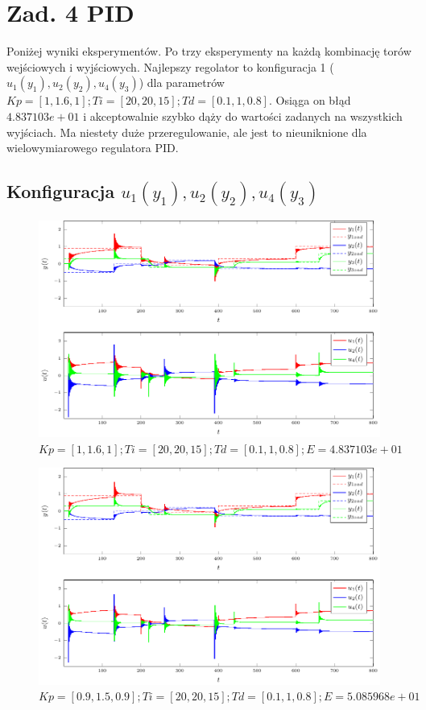 \documentclass[a4paper,titlepage,11pt,twosides,floatssmall]{mwrep}
\begin{document}
\chapter*{Zad. 4 PID}

Poniżej wyniki eksperymentów. Po trzy eksperymenty na każdą kombinację torów wejściowych i wyjściowych. Najlepszy regolator to konfiguracja 1 ($u_1(y_1), u_2(y_2), u_4(y_3)$) dla parametrów $Kp = [1, 1.6, 1]; Ti = [20, 20, 15]; Td= [0.1, 1, 0.8]$. Osiąga on błąd $4.837103e+01$ i akceptowalnie szybko dąży do wartości zadanych na wszystkich wyjściach. Ma niestety duże przeregulowanie, ale jest to nieuniknione dla wielowymiarowego regulatora PID.

\section*{Konfiguracja $u_1(y_1), u_2(y_2), u_4(y_3)$}



\begin{figure}[H]
	\centering
	\includegraphics[scale=1]{../wykresy/zad4_pid_1_1.pdf}
	\caption{$Kp = [1, 1.6, 1]; Ti = [20, 20, 15]; Td= [0.1, 1, 0.8]; E = 4.837103e+01$}
\end{figure}

\begin{figure}[H]
	\centering
	\includegraphics[scale=1]{../wykresy/zad4_pid_1_2.pdf}
	\caption{$Kp = [0.9, 1.5, 0.9]; Ti = [20, 20, 15]; Td= [0.1, 1, 0.8]; E = 5.085968e+01$}
\end{figure}
\end{document}
